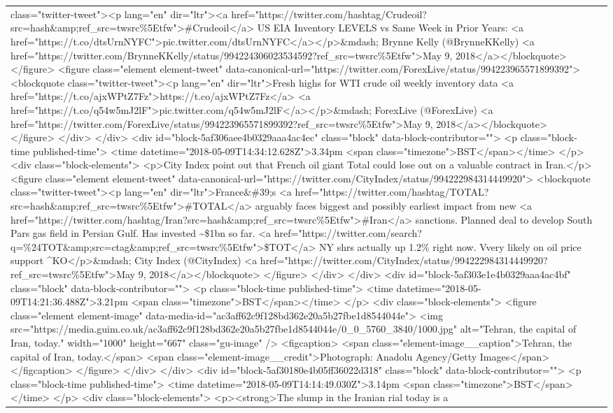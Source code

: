 \documentclass[]{article}
\begin{document}
\begin{table}[!h]
{\begin{tabular}[t]{ll}
class="twitter-tweet"><p lang="en" dir="ltr"><a href="https://twitter.com/hashtag/Crudeoil?src=hash\&amp;ref\_src=twsrc\%5Etfw">\#Crudeoil</a> US EIA Inventory LEVELS vs Same Week in Prior Years: <a href="https://t.co/dtsUrnNYFC">pic.twitter.com/dtsUrnNYFC</a></p>\&mdash; Brynne Kelly (@BrynneKKelly) <a href="https://twitter.com/BrynneKKelly/status/994224306023534592?ref\_src=twsrc\%5Etfw">May 9, 2018</a></blockquote>  </figure>  <figure class="element element-tweet" data-canonical-url="https://twitter.com/ForexLive/status/994223965571899392">  <blockquote class="twitter-tweet"><p lang="en" dir="ltr">Fresh highs for WTI crude oil weekly inventory data <a href="https://t.co/ajxWPtZ7Fz">https://t.co/ajxWPtZ7Fz</a> <a href="https://t.co/q54w5mJ2lF">pic.twitter.com/q54w5mJ2lF</a></p>\&mdash; ForexLive (@ForexLive) <a href="https://twitter.com/ForexLive/status/994223965571899392?ref\_src=twsrc\%5Etfw">May 9, 2018</a></blockquote>  </figure> </div>   </div> <div id="block-5af306aee4b0329aaa4ac4ec" class="block" data-block-contributor=""> <p class="block-time published-time"> <time datetime="2018-05-09T14:34:12.628Z">3.34pm <span class="timezone">BST</span></time> </p>    <div class="block-elements">  <p>City Index point out that French oil giant Total could lose out on a valuable contract in Iran.</p>  <figure class="element element-tweet" data-canonical-url="https://twitter.com/CityIndex/status/994222984314449920">  <blockquote class="twitter-tweet"><p lang="en" dir="ltr">France\&\#39;s <a href="https://twitter.com/hashtag/TOTAL?src=hash\&amp;ref\_src=twsrc\%5Etfw">\#TOTAL</a> arguably faces biggest and possibly earliest impact from new <a href="https://twitter.com/hashtag/Iran?src=hash\&amp;ref\_src=twsrc\%5Etfw">\#Iran</a> sanctions. Planned deal to develop South Pars gas field in Persian Gulf. Has invested \textasciitilde{}\$1bn so far. <a href="https://twitter.com/search?q=\%24TOT\&amp;src=ctag\&amp;ref\_src=twsrc\%5Etfw">\$TOT</a> NY shrs actually up 1.2\% right now. Vvery likely on oil price support \textasciicircum{}KO</p>\&mdash; City Index (@CityIndex) <a href="https://twitter.com/CityIndex/status/994222984314449920?ref\_src=twsrc\%5Etfw">May 9, 2018</a></blockquote>  </figure> </div>   </div> <div id="block-5af303e1e4b0329aaa4ac4bf" class="block" data-block-contributor=""> <p class="block-time published-time"> <time datetime="2018-05-09T14:21:36.488Z">3.21pm <span class="timezone">BST</span></time> </p>    <div class="block-elements">  <figure class="element element-image" data-media-id="ac3aff62c9f128bd362e20a5b27fbe1d8544044e"> <img src="https://media.guim.co.uk/ac3aff62c9f128bd362e20a5b27fbe1d8544044e/0\_0\_5760\_3840/1000.jpg" alt="Tehran, the capital of Iran, today." width="1000" height="667" class="gu-image" /> <figcaption> <span class="element-image\_\_caption">Tehran, the capital of Iran, today.</span> <span class="element-image\_\_credit">Photograph: Anadolu Agency/Getty Images</span> </figcaption> </figure> </div>   </div> <div id="block-5af30180e4b05ff36022d318" class="block" data-block-contributor=""> <p class="block-time published-time"> <time datetime="2018-05-09T14:14:49.030Z">3.14pm <span class="timezone">BST</span></time> </p>    <div class="block-elements">  <p><strong>The slump in the Iranian rial today is a 
\end{tabular}}
\end{table}
\end{document}
